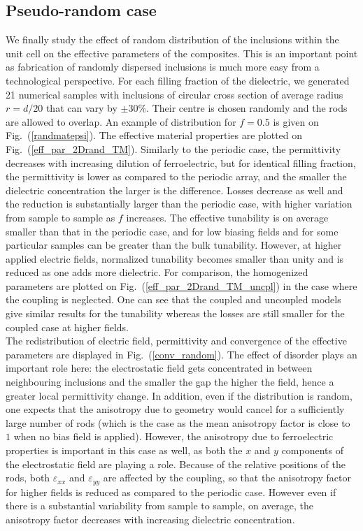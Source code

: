 \documentclass[%
 aip,
 amsmath,amssymb,
 reprint,%
]{revtex4-1}
\newcommand{\fig}[1]{Fig.~(\ref{#1})}
\begin{document}
\subsection{Pseudo-random case}



We finally study the effect of random distribution of the inclusions within the unit cell on the effective parameters of the
composites. This is an important point as fabrication of randomly dispersed
inclusions is much more easy from a technological perspective. For each filling fraction of the dielectric,
we generated 21 numerical samples with inclusions of circular cross section of average radius
$r=d/20$ that can vary by $\pm 30\%$. Their centre is chosen randomly and the
rods are allowed to overlap. An example of distribution for $f=0.5$ is given on \fig{randmatepsi}.
The effective material properties are plotted on \fig{eff_par_2Drand_TM}.
Similarly to the periodic case, the permittivity decreases with increasing dilution of
ferroelectric, but for identical filling fraction,
the permittivity is lower as compared to the periodic array, and the smaller the dielectric concentration the larger
is the difference. Losses decrease as well and the reduction is substantially larger
than the periodic case, with higher variation from sample to sample as $f$ increases.
The effective tunability is on average smaller than that in the periodic case, and
for low biasing fields and for some particular samples can be greater than the bulk tunability. However,
at higher applied electric fields, normalized tunability becomes smaller than unity and
is reduced as one adds more dielectric. For comparison, the homogenized
parameters are plotted on \fig{eff_par_2Drand_TM_uncpl} in the case where the coupling is
neglected. One can see that the coupled and uncoupled models give
similar results for the tunability whereas the losses are still smaller for the coupled case
at higher fields.\\
The redistribution of electric field, permittivity and convergence of
the effective parameters are displayed in \fig{conv_random}. The effect of
disorder plays an important role here: the electrostatic field gets concentrated
in between neighbouring inclusions and the smaller the gap the higher the field, hence
a greater local permittivity change. In addition, even if the distribution is
random, one expects that the anisotropy due to geometry would cancel for a sufficiently large number
of rods (which is the case as the mean anisotropy factor is close to $1$ when no
bias field is applied). However, the anisotropy due to ferroelectric properties is
important in this case as well, as both the $x$ and $y$ components of the electrostatic field
are playing a role.
Because of the relative positions of the rods, both $\varepsilon_{xx}$ and $\varepsilon_{yy}$ are affected
by the coupling, so that the anisotropy factor for higher fields is reduced as compared to the periodic case.
However even if there is a substantial variability from sample to sample, on average, the anisotropy factor
decreases with increasing dielectric concentration.
\end{document}
